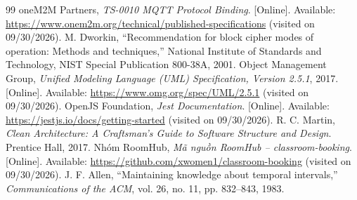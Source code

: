 \begin{thebibliography}{99}
 oneM2M Partners, \textit{TS-0010 MQTT Protocol Binding}. [Online]. Available: \url{https://www.onem2m.org/technical/published-specifications} (visited on 09/30/2026).
 M. Dworkin, ``Recommendation for block cipher modes of operation: Methods and techniques,'' National Institute of Standards and Technology, NIST Special Publication 800-38A, 2001.
 Object Management Group, \textit{Unified Modeling Language (UML) Specification, Version 2.5.1}, 2017. [Online]. Available: \url{https://www.omg.org/spec/UML/2.5.1} (visited on 09/30/2026).
 OpenJS Foundation, \textit{Jest Documentation}. [Online]. Available: \url{https://jestjs.io/docs/getting-started} (visited on 09/30/2026).
 R. C. Martin, \textit{Clean Architecture: A Craftsman's Guide to Software Structure and Design}. Prentice Hall, 2017.
 Nhóm RoomHub, \textit{Mã nguồn RoomHub -- classroom-booking}. [Online]. Available: \url{https://github.com/xwomen1/classroom-booking} (visited on 09/30/2026).
 J. F. Allen, ``Maintaining knowledge about temporal intervals,'' \textit{Communications of the ACM}, vol. 26, no. 11, pp. 832--843, 1983.
\end{thebibliography}
